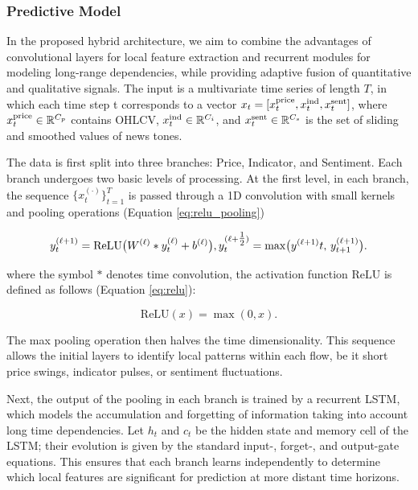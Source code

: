 \subsubsection{Predictive Model}
In the proposed hybrid architecture, we aim to combine the advantages of convolutional layers for local feature
extraction and recurrent modules for modeling long-range dependencies, while providing adaptive fusion of quantitative
and qualitative signals. The input is a multivariate time series of length $T$, in which each time step t corresponds
to a vector $x_t = [x_t^{\rm price}, x_t^{\rm ind}, x_t^{\rm sent}]$, where $x_t^{\rm price}\in\mathbb{R}^{C_p}$ contains
OHLCV, $x_t^{\rm ind}\in\mathbb{R}^{C_i}$, and $x_t^{\rm sent}\in\mathbb{R}^{C_s}$ is the set of sliding and smoothed
values of news tones.

The data is first split into three branches: Price, Indicator, and Sentiment. Each branch undergoes two basic levels
of processing. At the first level, in each branch, the sequence $\{x_t^{(\cdot)}\}_{t=1}^T$ is passed through
a 1D convolution with small kernels and pooling operations (Equation \ref{eq:relu_pooling})

\begin{equation}\label{eq:relu_pooling}
    y^{(\ell+1)}_{t} = \mathrm{ReLU}\bigl(W^{(\ell)} * y^{(\ell)}_{t} + b^{(\ell)}\bigr), \\
    y^{(\ell+\tfrac12)}_{t} = \max\bigl(y^{(\ell+1)}{t},\,y^{(\ell+1)}_{t+1}\bigr).
\end{equation}

where the symbol $*$ denotes time convolution, the activation function $\mathrm{ReLU}$ is defined as follows
(Equation \ref{eq:relu}):

\begin{equation}\label{eq:relu}
    \mathrm{ReLU}(x)=\max(0, x).
\end{equation}

The max pooling operation then halves the time dimensionality. This sequence allows the initial layers to identify
local patterns within each flow, be it short price swings, indicator pulses, or sentiment fluctuations.

Next, the output of the pooling in each branch is trained by a recurrent LSTM, which models the accumulation
and forgetting of information taking into account long time dependencies. Let $h_t$ and $c_t$ be the hidden state
and memory cell of the LSTM; their evolution is given by the standard input-, forget-, and output-gate equations.
This ensures that each branch learns independently to determine which local features are significant for prediction
at more distant time horizons.

